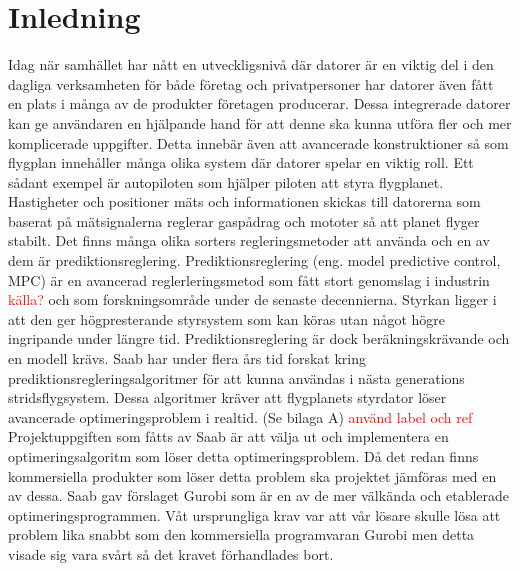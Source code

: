 \section{Inledning}
Idag när samhället har nått en utveckligsnivå där datorer är en viktig del i den dagliga verksamheten för både företag och privatpersoner har datorer även fått en plats i många av de produkter företagen producerar. Dessa integrerade datorer kan ge användaren en hjälpande hand för att denne ska kunna utföra fler och mer komplicerade uppgifter. Detta innebär även att avancerade konstruktioner så som flygplan innehåller många olika system där datorer spelar en viktig roll. Ett sådant exempel är autopiloten som hjälper piloten att styra flygplanet. Hastigheter och positioner mäts och informationen skickas till datorerna som baserat på mätsignalerna reglerar gaspådrag och mototer så att planet flyger stabilt. Det finns många olika sorters regleringsmetoder att använda och en av dem är prediktionsreglering. 
\newline
\newline
Prediktionsreglering (eng. model predictive control, MPC) är en avancerad reglerleringsmetod som fått stort genomslag i industrin\textcolor{red}{ källa?} och som forskningsområde under de senaste decennierna. Styrkan ligger i att den ger högpresterande styrsystem som kan köras utan något högre ingripande under längre tid. Prediktionsreglering är dock beräkningskrävande och en modell krävs. \citep[2]{ir}
\newline
\newline
Saab har under flera års tid forskat kring prediktionsregleringsalgoritmer för att kunna användas i nästa generations stridsflygsystem. Dessa algoritmer kräver att flygplanets styrdator löser avancerade optimeringsproblem i realtid. (Se bilaga A)
\textcolor{red}{ använd label och ref}
\newline
\newline
Projektuppgiften som fåtts av Saab är att välja ut och implementera en optimeringsalgoritm som löser detta optimeringsproblem. Då det redan finns kommersiella produkter som löser detta problem ska projektet jämföras med en av dessa. Saab gav förslaget Gurobi som är en av de mer välkända och etablerade optimeringsprogrammen. Våt ursprungliga krav var att vår lösare skulle lösa att problem lika snabbt som den kommersiella programvaran Gurobi men detta visade sig vara svårt så det kravet förhandlades bort. 

